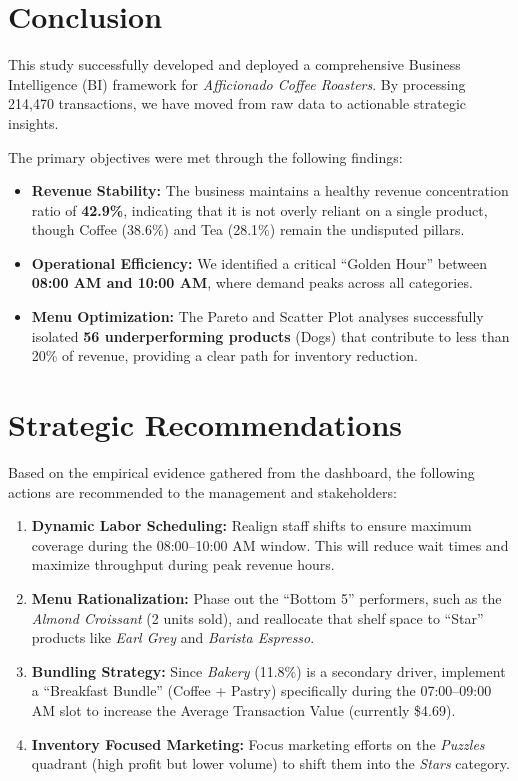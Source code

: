 \documentclass[12pt, a4paper]{article}
\begin{document}
	\newpage
\section{Conclusion}
This study successfully developed and deployed a comprehensive Business Intelligence (BI) framework for \textit{Afficionado Coffee Roasters}. By processing 214,470 transactions, we have moved from raw data to actionable strategic insights.

The primary objectives were met through the following findings:
\begin{itemize}
    \item \textbf{Revenue Stability:} The business maintains a healthy revenue concentration ratio of \textbf{42.9\%}, indicating that it is not overly reliant on a single product, though Coffee (38.6\%) and Tea (28.1\%) remain the undisputed pillars.
    \item \textbf{Operational Efficiency:} We identified a critical ``Golden Hour'' between \textbf{08:00 AM and 10:00 AM}, where demand peaks across all categories.
    \item \textbf{Menu Optimization:} The Pareto and Scatter Plot analyses successfully isolated \textbf{56 underperforming products} (Dogs) that contribute to less than 20\% of revenue, providing a clear path for inventory reduction.
\end{itemize}

\section{Strategic Recommendations}
Based on the empirical evidence gathered from the dashboard, the following actions are recommended to the management and stakeholders:

\begin{enumerate}
    \item \textbf{Dynamic Labor Scheduling:} Realign staff shifts to ensure maximum coverage during the 08:00--10:00 AM window. This will reduce wait times and maximize throughput during peak revenue hours.
    \item \textbf{Menu Rationalization:} Phase out the ``Bottom 5'' performers, such as the \textit{Almond Croissant} (2 units sold), and reallocate that shelf space to ``Star'' products like \textit{Earl Grey} and \textit{Barista Espresso}.
    \item \textbf{Bundling Strategy:} Since \textit{Bakery} (11.8\%) is a secondary driver, implement a ``Breakfast Bundle'' (Coffee + Pastry) specifically during the 07:00--09:00 AM slot to increase the Average Transaction Value (currently \$4.69).
    \item \textbf{Inventory Focused Marketing:} Focus marketing efforts on the \textit{Puzzles} quadrant (high profit but lower volume) to shift them into the \textit{Stars} category.
\end{enumerate}
\end{document}
